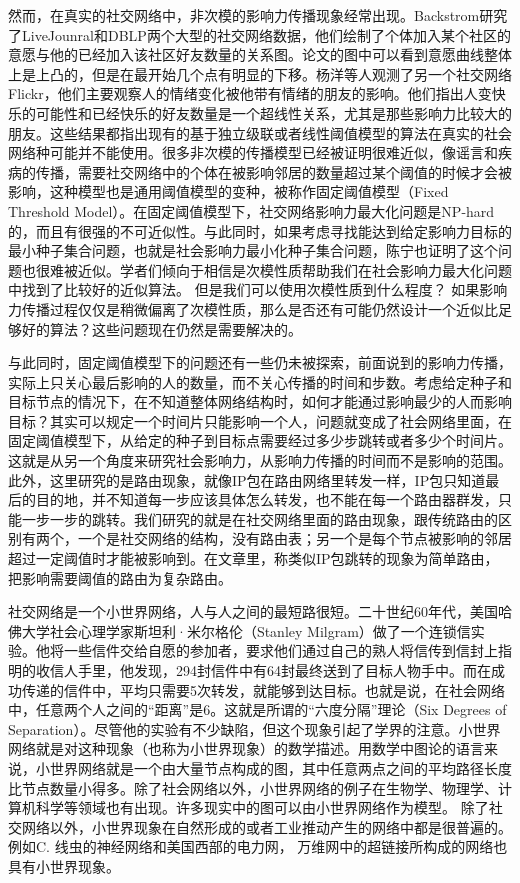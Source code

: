 然而，在真实的社交网络中，非次模的影响力传播现象经常出现。Backstrom\cite{backstrom2006group}研究了LiveJounral和DBLP两个大型的社交网络数据，他们绘制了个体加入某个社区的意愿与他的已经加入该社区好友数量的关系图。论文的图中可以看到意愿曲线整体上是上凸的，但是在最开始几个点有明显的下移。杨洋\cite{yang2016role}等人观测了另一个社交网络Flickr，他们主要观察人的情绪变化被他带有情绪的朋友的影响。他们指出人变快乐的可能性和已经快乐的好友数量是一个超线性关系，尤其是那些影响力比较大的朋友。这些结果都指出现有的基于独立级联或者线性阈值模型的算法在真实的社会网络种可能并不能使用。很多非次模的传播模型已经被证明很难近似，像谣言和疾病的传播，需要社交网络中的个体在被影响邻居的数量超过某个阈值的时候才会被影响，这种模型也是通用阈值模型的变种，被称作固定阈值模型（Fixed Threshold Model）。在固定阈值模型下，社交网络影响力最大化问题是NP-hard的，而且有很强的不可近似性\cite{Kempe2003maximizing}。与此同时，如果考虑寻找能达到给定影响力目标的最小种子集合问题，也就是社会影响力最小化种子集合问题，陈宁也证明了这个问题也很难被近似\cite{Chen2008approximability}。学者们倾向于相信是次模性质帮助我们在社会影响力最大化问题中找到了比较好的近似算法。
但是我们可以使用次模性质到什么程度？
如果影响力传播过程仅仅是稍微偏离了次模性质，那么是否还有可能仍然设计一个近似比足够好的算法？这些问题现在仍然是需要解决的。

与此同时，固定阈值模型下的问题还有一些仍未被探索，前面说到的影响力传播，实际上只关心最后影响的人的数量，而不关心传播的时间和步数。考虑给定种子和目标节点的情况下，在不知道整体网络结构时，如何才能通过影响最少的人而影响目标？其实可以规定一个时间片只能影响一个人，问题就变成了社会网络里面，在固定阈值模型下，从给定的种子到目标点需要经过多少步跳转或者多少个时间片。这就是从另一个角度来研究社会影响力，从影响力传播的时间而不是影响的范围。此外，这里研究的是路由现象，就像IP包在路由网络里转发一样，IP包只知道最后的目的地，并不知道每一步应该具体怎么转发，也不能在每一个路由器群发，只能一步一步的跳转。我们研究的就是在社交网络里面的路由现象，跟传统路由的区别有两个，一个是社交网络的结构，没有路由表；另一个是每个节点被影响的邻居超过一定阈值时才能被影响到。在文章里，称类似IP包跳转的现象为简单路由，把影响需要阈值的路由为复杂路由。

社交网络是一个小世界网络，人与人之间的最短路很短。二十世纪60年代，美国哈佛大学社会心理学家斯坦利·米尔格伦（Stanley Milgram）做了一个连锁信实验\cite{Milgram1967small}。他将一些信件交给自愿的参加者，要求他们通过自己的熟人将信传到信封上指明的收信人手里，他发现，294封信件中有64封最终送到了目标人物手中。而在成功传递的信件中，平均只需要5次转发，就能够到达目标。也就是说，在社会网络中，任意两个人之间的“距离”是6。这就是所谓的“六度分隔”理论（Six Degrees of Separation）。尽管他的实验有不少缺陷，但这个现象引起了学界的注意。小世界网络就是对这种现象（也称为小世界现象）的数学描述。用数学中图论的语言来说，小世界网络就是一个由大量节点构成的图，其中任意两点之间的平均路径长度比节点数量小得多。除了社会网络以外，小世界网络的例子在生物学、物理学、计算机科学等领域也有出现。许多现实中的图可以由小世界网络作为模型。
除了社交网络以外，小世界现象在自然形成的或者工业推动产生的网络中都是很普遍的。
例如C. 线虫的神经网络和美国西部的电力网\cite{Watts1998collective}，
万维网中的超链接所构成的网络也具有小世界现象\cite{Albert1999internet}。

